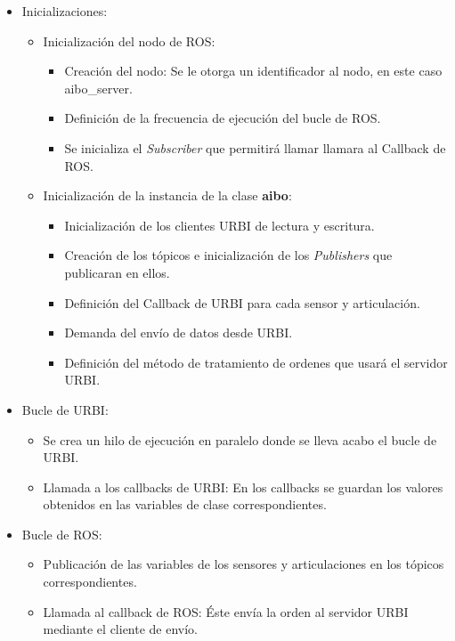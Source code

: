 \documentclass[12pt,a4paper,final,twoside]{book}
\begin{document}
\begin{itemize}
\item Inicializaciones: 
\begin{itemize}
\item Inicialización del nodo de ROS:
\begin{itemize}
\item Creación del nodo: Se le otorga un identificador al nodo, en este caso aibo{\_}server.
\item Definición de la frecuencia de ejecución del bucle de ROS.
\item Se inicializa el \textit{Subscriber} que permitirá llamar llamara al Callback de ROS.   
\end{itemize}

\item Inicialización de la instancia de la clase \textbf{aibo}:
\begin{itemize}
\item Inicialización de los clientes URBI de lectura y escritura.
\item Creación de los tópicos e inicialización de los \textit{Publishers} que publicaran en ellos.
\item Definición del Callback de URBI para cada sensor y articulación.
\item Demanda del envío de datos desde URBI.
\item Definición del método de tratamiento de ordenes que usará el servidor URBI.
\end{itemize}
\end{itemize}
\item Bucle de URBI:
\begin{itemize}
\item Se crea un hilo de ejecución en paralelo donde se lleva acabo el bucle de URBI.
\item Llamada a los callbacks de URBI: En los callbacks se guardan los valores obtenidos en las variables de clase correspondientes.

\end{itemize}
\item Bucle de ROS:
\begin{itemize}
\item Publicación de las variables de los sensores y articulaciones en los tópicos correspondientes.
\item Llamada al callback de ROS: Éste envía la orden al servidor URBI mediante el cliente de envío.
\end{itemize}
\end{itemize}
\end{document}
